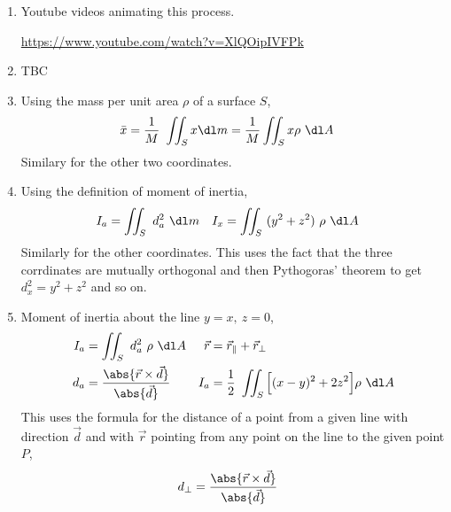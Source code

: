 \begin{enumerate}
    \item Youtube videos animating this process. \par
          \url{https://www.youtube.com/watch?v=XlQOipIVFPk}

    \item TBC

    \item Using the mass per unit area $ \rho $  of a surface $ S $,
          \begin{align}
              \bar{x} & = \frac{1}{M}\ \iint_S x \dl m
              = \frac{1}{M} \iint_S x \rho\ \dl A
          \end{align}
          Similary for the other two coordinates.

    \item Using the definition of moment of inertia,
          \begin{align}
              I_a & = \iint_S \ d_a^2\ \dl m             &
              I_x & = \iint_S \ (y^2 + z^2)\ \rho\ \dl A
          \end{align}
          Similarly for the other coordinates. This uses the fact that the three
          corrdinates are mutually orthogonal and then Pythogoras' theorem to get
          $ d_x^2 = y^2 + z^2 $ and so on.

    \item Moment of inertia about the line $ y = x,\ z = 0 $,
          \begin{align}
              I_a     & = \iint_S \ d_a^2\ \rho\ \dl A                       &
              \vec{r} & = \vec{r}_{\parallel} + \vec{r}_{\perp}                \\
              d_a     & = \frac{\abs{\vec{r} \times \vec{d}}}{\abs{\vec{d}}} &
              I_a     & = \frac{1}{2}\ \iint_S \Big[(x - y)^2 + 2z^2\Big]
              \rho\ \dl A
          \end{align}
          This uses the formula for the distance of a point from a given line with
          direction $ \vec{d} $ and with $ \vec{r} $ pointing from any point on the line
          to the given point $ P $,
          \begin{align}
              d_{\perp} & = \frac{\abs{\vec{r} \times \vec{d}}}{\abs{\vec{d}}}
          \end{align}


\end{enumerate}
